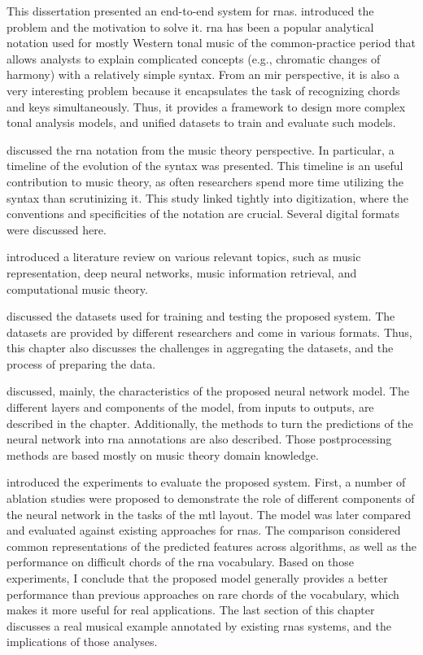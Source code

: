 
This dissertation presented an end-to-end system for
\glspl{rna}.  introduced the problem
and the motivation to solve it. \gls{rna} has been a popular
analytical notation used for mostly Western tonal music of
the common-practice period that allows analysts to explain
complicated concepts (e.g., chromatic changes of harmony)
with a relatively simple syntax. From an \gls{mir}
perspective, it is also a very interesting problem because
it encapsulates the task of recognizing chords and keys
simultaneously. Thus, it provides a framework to design more
complex tonal analysis models, and unified datasets to train
and evaluate such models.

 discussed the
\gls{rna} notation from the music theory perspective. In
particular, a timeline of the evolution of the syntax was
presented. This timeline is an useful contribution to music
theory, as often researchers spend more time utilizing the
syntax than scrutinizing it. This study linked tightly into
digitization, where the conventions and specificities of the
notation are crucial. Several digital formats were discussed
here.

 introduced a literature review on
various relevant topics, such as music representation, deep
neural networks, music information retrieval, and
computational music theory.

 discussed the
datasets used for training and testing the proposed system.
The datasets are provided by different researchers and come
in various formats. Thus, this chapter also discusses the
challenges in aggregating the datasets, and the process of
preparing the data.

 discussed, mainly, the characteristics
of the proposed neural network model. The different layers
and components of the model, from inputs to outputs, are
described in the chapter. Additionally, the methods to turn
the predictions of the neural network into \gls{rna}
annotations are also described. Those postprocessing methods
are based mostly on music theory domain knowledge.

 introduced the experiments
to evaluate the proposed system. First, a number of ablation
studies were proposed to demonstrate the role of different
components of the neural network in the tasks of the
\gls{mtl} layout. The model was later compared and evaluated
against existing approaches for \glspl{rna}. The comparison
considered common representations of the predicted features
across algorithms, as well as the performance on difficult
chords of the \gls{rna} vocabulary. Based on those
experiments, I conclude that the proposed model generally
provides a better performance than previous approaches on
rare chords of the vocabulary, which makes it more useful
for real applications. The last section of this chapter
discusses a real musical example annotated by existing
\glspl{rna} systems, and the implications of those analyses.
